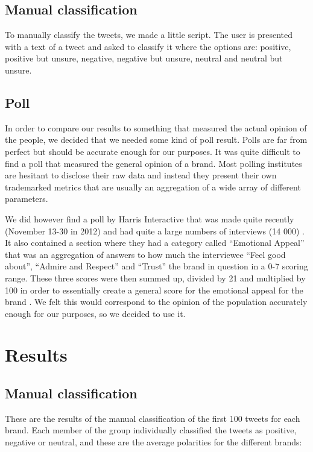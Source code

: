 \documentclass[a4paper,12pt]{report}
\begin{document}
\section{Manual classification}

To manually classify the tweets, we made a little script.
The user is presented with a text of a tweet and asked to classify it where the options are: positive, positive but unsure, negative, negative but unsure, neutral and neutral but unsure.

\section{Poll}

In order to compare our results to something that measured the actual opinion of the people, we decided that we needed some kind of poll result. 
Polls are far from perfect but should be accurate enough for our purposes. It was quite difficult to find a poll that measured the general opinion of a brand. 
Most polling institutes are hesitant to disclose their raw data and instead they present their own trademarked metrics that are usually an aggregation of a wide array of different parameters.

We did however find a poll by Harris Interactive that was made quite recently (November 13-30 in 2012) and had quite a large numbers of interviews (14 000) \cite{Harris13}. 
It also contained a section where they had a category called “Emotional Appeal” that was an aggregation of answers to how much the interviewee “Feel good about”, “Admire and Respect” and “Trust” the brand in question in a 0-7 scoring range. 
These three scores were then summed up, divided by 21 and multiplied by 100 in order to essentially create a general score for the emotional appeal for the brand \cite{Harris13}. 
We felt this would correspond to the opinion of the population accurately enough for our purposes, so we decided to use it.

\chapter{Results}

\section{Manual classification}

These are the results of the manual classification of the first 100 tweets for each brand. Each member of the group individually classified the tweets as positive, negative or neutral, and these are the average polarities for the different brands:
\end{document}
